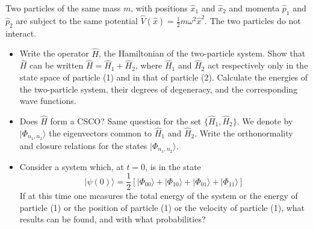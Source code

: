 \documentclass[12pt,a4paper]{article}
\newenvironment{problem}[2][Problem]{\begin{trivlist}
\item[\hskip \labelsep {\bfseries #1}\hskip \labelsep {\bfseries #2.}]}{\end{trivlist}}
\begin{document}
\begin{problem}{2}
[C-T Exercise 5-3] Two particles of the same mass $m$, with positions $\hat{x}_1$ and $\hat{x}_2$ and momenta $\hat{p}_1$ and $\hat{p}_2$ are subject to the same potential $\hat{V}(\hat{x})=\frac{1}{2}m\omega^2\hat{x}^2$. The two particles do not interact.
\begin{itemize}
\item[(a)] Write the operator $\hat{H}$, the Hamiltonian of the two-particle system. Show that $\hat{H}$ can be written $\hat{H}=\hat{H}_1+\hat{H}_2$, where $\hat{H}_1$ and $\hat{H}_2$ act respectively only in the state space of particle (1) and in that of particle (2). Calculate the energies of the two-particle system, their degrees of degeneracy, and the corresponding wave functions.
\item[(b)] Does $\hat{H}$ form a CSCO? Same question for the set $\{\hat{H}_1,\hat{H}_2\}$. We denote by $|\Phi_{n_1,n_2}\rangle$ the eigenvectors common to $\hat{H}_1$ and $\hat{H}_2$. Write the orthonormality and closure relations for the states $|\Phi_{n_1,n_2}\rangle$.
\item[(c)] Consider a system which, at $t=0$, is in the state
\[
|\psi(0)\rangle=\frac{1}{2}[|\Phi_{00}\rangle+|\Phi_{10}\rangle+|\Phi_{01}\rangle+|\Phi_{11}\rangle]
\]
If at this time one measures the total energy of the system or the energy of particle (1) or the position of particle (1) or the velocity of particle (1), what results can be found, and with what probabilities?
\end{itemize}
\end{problem}
\end{document}
